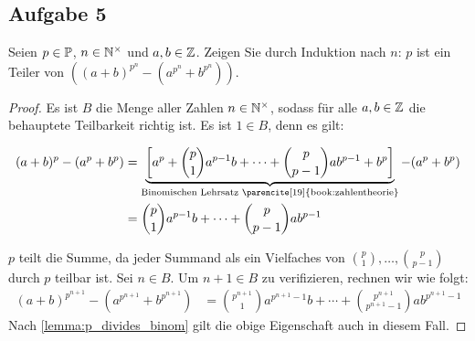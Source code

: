 \subsection{Aufgabe 5}
Seien $p \in \mathbb{P}{}$, $n \in \mathbb{N}^\times{}$ und $a,b \in \mathbb{Z}{}$. Zeigen Sie durch Induktion
nach $n$: $p$ ist ein Teiler von
$((a + b)^{p^n} - (a^{p^n} + b^{p^n}))$.
\begin{proof}
  Es ist $B$ die Menge aller Zahlen $n \in \mathbb{N}^\times{}$,
  sodass für alle $a,b \in \mathbb{Z}{}$ die behauptete Teilbarkeit richtig ist.
  Es ist $1 \in B$, denn es gilt:
  \begin{widemath}
    \begin{equation*}
      \begin{aligned}
        (a + b)^p - (a^p + b^p) & =
        \underbrace{\left[a^p + \binom{p}{1}a^{p-1}b + \dotsb +
        \binom{p}{p - 1}ab^{p-1} + b^p\right]}_{\text{Binomischen Lehrsatz \parencite[19]{book:zahlentheorie}}} - (a^p + b^p) \\
                                & = \binom{p}{1}a^{p-1}b + \dotsb + \binom{p}{p - 1}ab^{p-1}
      \end{aligned}
    \end{equation*}
  \end{widemath}
  $p$ teilt die Summe, da jeder Summand als ein Vielfaches
  von $\binom{p}{1},\dotsc,\binom{p}{p - 1}$ durch $p$ teilbar ist.
  Sei $n \in B$. Um $n + 1 \in B$ zu verifizieren, rechnen wir wie folgt:
  \begin{equation*}
    \begin{aligned}
      (a + b)^{p^{n+1}} - (a^{p^{n+1}} + b^{p^{n+1}}) & =
      \binom{p^{n+1}}{1}a^{p^{n+1}-1}b + \dotsb + \binom{p^{n+1}}{p^{n+1} - 1}ab^{p^{n+1}-1}
    \end{aligned}
  \end{equation*}
  Nach \autoref{lemma:p_divides_binom} gilt die obige Eigenschaft auch in diesem Fall.
\end{proof}

